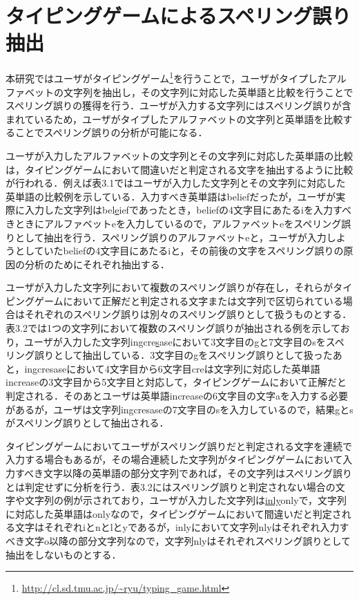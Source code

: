 \documentclass{jarticle}
\begin{document}
\section{タイピングゲームによるスペリング誤り抽出}
本研究ではユーザがタイピングゲーム\footnote{\url{http://cl.sd.tmu.ac.jp/~ryu/typing_game.html}}を行うことで，ユーザがタイプしたアルファベットの文字列を抽出し，その文字列に対応した英単語と比較を行うことでスペリング誤りの獲得を行う．ユーザが入力する文字列にはスペリング誤りが含まれているため，ユーザがタイプしたアルファベットの文字列と英単語を比較することでスペリング誤りの分析が可能になる．

ユーザが入力したアルファベットの文字列とその文字列に対応した英単語の比較は，タイピングゲームにおいて間違いだと判定される文字を抽出するように比較が行われる．例えば表3.1ではユーザが入力した文字列とその文字列に対応した英単語の比較例を示している．入力すべき英単語はbeliefだったが，ユーザが実際に入力した文字列はbel\underline{e}iefであったとき，beliefの4文字目にあたるiを入力すべきときにアルファベットeを入力しているので，アルファベットeをスペリング誤りとして抽出を行う．スペリング誤りのアルファベットeと，ユーザが入力しようとしていたbeliefの4文字目にあたるiと，その前後の文字をスペリング誤りの原因の分析のためにそれぞれ抽出する．

ユーザが入力した文字列において複数のスペリング誤りが存在し，それらがタイピングゲームにおいて正解だと判定される文字または文字列で区切られている場合はそれぞれのスペリング誤りは別々のスペリング誤りとして扱うものとする．表3.2では1つの文字列において複数のスペリング誤りが抽出される例を示しており，ユーザが入力した文字列in\underline{g}cre\underline{s}aseにおいて3文字目のgと7文字目のsをスペリング誤りとして抽出している．3文字目のgをスペリング誤りとして扱ったあと，ingcresaseにおいて4文字目から6文字目creは文字列に対応した英単語increaseの3文字目から5文字目と対応して，タイピングゲームにおいて正解だと判定される．そのあとユーザは英単語increaseの6文字目の文字aを入力する必要があるが，ユーザは文字列ingcresaseの7文字目のsを入力しているので，結果gとsがスペリング誤りとして抽出される．

タイピングゲームにおいてユーザがスペリング誤りだと判定される文字を連続で入力する場合もあるが，その場合連続した文字列がタイピングゲームにおいて入力すべき文字以降の英単語の部分文字列であれば，その文字列はスペリング誤りとは判定せずに分析を行う．表3.2にはスペリング誤りと判定されない場合の文字や文字列の例が示されており，ユーザが入力した文字列は\underline{inly}onlyで，文字列に対応した英単語はonlyなので，タイピングゲームにおいて間違いだと判定される文字はそれぞれiとnとlとyであるが，inlyにおいて文字列nlyはそれぞれ入力すべき文字o以降の部分文字列なので，文字列nlyはそれぞれスペリング誤りとして抽出をしないものとする．
\end{document}
